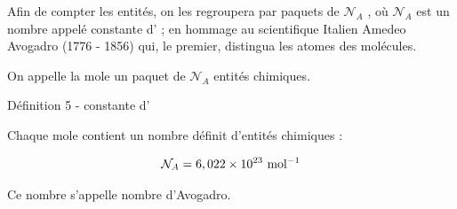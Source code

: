 \documentclass[french, a4paper, 12pt, landscape, twocolumn]{article}
\begin{document}
\begin{minipage}{.3\textwidth}
	Afin de compter les entités, on les regroupera par
paquets de $\mathcal{N}_A$ , où $\mathcal{N}_A$ est un nombre appelé constante d' ; en hommage au scientifique Italien Amedeo Avogadro (1776 - 1856) qui, le premier, distingua les atomes des molécules.\bigskip

On appelle la mole un paquet de $\mathcal{N}_A$ entités chimiques.
\end{minipage}\hspace{.5cm}
\begin{minipage}{.12\textwidth}
\end{minipage}

\begin{definition}{Définition 5 - constante d'}

Chaque mole contient un nombre définit d'entités chimiques : 

$$\mathcal{N}_A = 6,022\times 10^{23}~\rm mol^{-1}$$

Ce nombre s'appelle nombre d'Avogadro. 
\end{definition}
\end{document}
